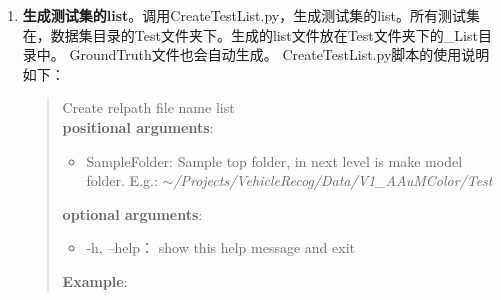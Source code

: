 \documentclass{article}
\begin{document}
\begin{CJK}{UTF8}{gbsn}
\begin{enumerate}
  \item \textbf{生成测试集的list}。调用CreateTestList.py，生成测试集的list。所有测试集在，数据集目录的Test文件夹下。生成的list文件放在Test文件夹下的\_List目录中。
               GroundTruth文件也会自动生成。
        CreateTestList.py脚本的使用说明如下：\\
    \begin{quotation}
       Create relpath file name list \\
       \textbf{positional arguments}:\\
       \begin{itemize}
       \item SampleFolder:  Sample top folder, in next level is make model folder. E.g.: \textit{ $\sim$/Projects/VehicleRecog/Data/V1\_AAuMColor/Test }
       \end{itemize}
       \textbf{optional arguments}:
       \begin{itemize}
       \item -h, --help：    show this help message and exit
       \end{itemize}    
       \textbf{Example}:\\
       \textit{\color{blue}{CreateTestList.py $\sim$/Projects/VehicleRecog/Data/V1\_AAuMColor/Test}}
       
     \end{quotation}
     

\end{enumerate}
\end{CJK}
\end{document}
